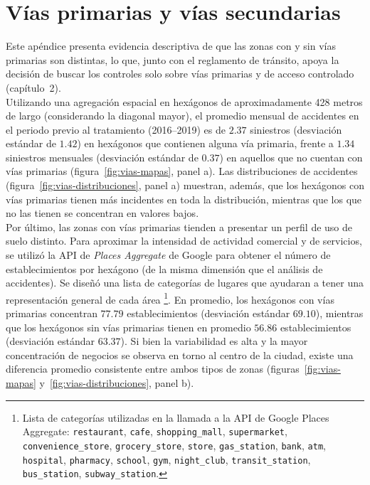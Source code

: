 \chapter{Vías primarias y vías secundarias}
\label{apendice:vias}

\noindent Este apéndice presenta evidencia descriptiva de que las zonas con y sin vías primarias son distintas, lo que, junto con el reglamento de tránsito, apoya la decisión de buscar los controles solo sobre vías primarias y de acceso controlado (capítulo~2).\\

Utilizando una agregación espacial en hexágonos de aproximadamente 428 metros de largo (considerando la diagonal mayor), el promedio mensual de accidentes en el periodo previo al tratamiento (2016--2019) es de $2.37$ siniestros (desviación estándar de $1.42$) en hexágonos que contienen alguna vía primaria, frente a $1.34$ siniestros mensuales (desviación estándar de $0.37$) en aquellos que no cuentan con vías primarias (figura~\ref{fig:vias-mapas}, panel a). Las distribuciones de accidentes (figura~\ref{fig:vias-distribuciones}, panel a) muestran, además, que los hexágonos con vías primarias tienen más incidentes en toda la distribución, mientras que los que no las tienen se concentran en valores bajos.\\

Por último, las zonas con vías primarias tienden a presentar un perfil de uso de suelo distinto. Para aproximar la intensidad de actividad comercial y de servicios, se utilizó la API de \emph{Places Aggregate} de Google para obtener el número de establecimientos por hexágono (de la misma dimensión que el análisis de accidentes). Se diseñó una lista de categorías de lugares que ayudaran a tener una representación general de cada área \footnote{Lista de categorías utilizadas en la llamada a la API de Google Places Aggregate: \texttt{restaurant}, \texttt{cafe}, \texttt{shopping\_mall}, \texttt{supermarket}, \texttt{convenience\_store}, \texttt{grocery\_store}, \texttt{store}, \texttt{gas\_station}, \texttt{bank}, \texttt{atm}, \texttt{hospital}, \texttt{pharmacy}, \texttt{school}, \texttt{gym}, \texttt{night\_club}, \texttt{transit\_station}, \texttt{bus\_station}, \texttt{subway\_station}.}. En promedio, los hexágonos con vías primarias concentran $77.79$ establecimientos (desviación estándar $69.10$), mientras que los hexágonos sin vías primarias tienen en promedio $56.86$ establecimientos (desviación estándar $63.37$). Si bien la variabilidad es alta y la mayor concentración de negocios se observa en torno al centro de la ciudad, existe una diferencia promedio consistente entre ambos tipos de zonas (figuras~\ref{fig:vias-mapas} y~\ref{fig:vias-distribuciones}, panel b).

